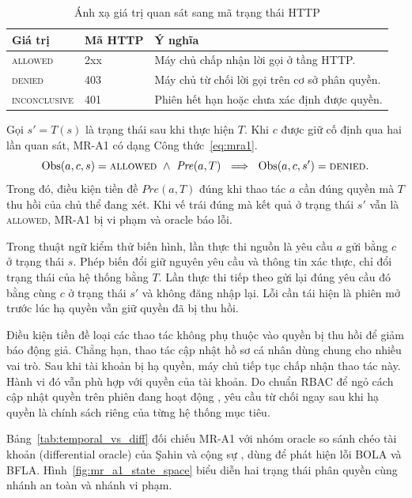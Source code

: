 \begin{table}[htbp]
  \centering
  \caption{Ánh xạ giá trị quan sát sang mã trạng thái HTTP}
  \label{tab:obs_status}
  \begin{tabularx}{\textwidth}{llX}
    \toprule
    Giá trị & Mã HTTP & Ý nghĩa \\
    \midrule
    \textsc{allowed} & 2xx & Máy chủ chấp nhận lời gọi ở tầng HTTP. \\
    \textsc{denied} & 403 & Máy chủ từ chối lời gọi trên cơ sở phân quyền. \\
    \textsc{inconclusive} & 401 & Phiên hết hạn hoặc chưa xác định được quyền. \\
    \bottomrule
  \end{tabularx}
\end{table}

Gọi $s' = T(s)$ là trạng thái sau khi thực hiện $T$. Khi $c$ được giữ cố định qua hai lần quan sát, MR-A1 có dạng Công thức~\eqref{eq:mra1}.
\begin{equation}
  \mathrm{Obs}(a, c, s) = \textsc{allowed}\ \wedge\ \mathit{Pre}(a, T)\ \implies\ \mathrm{Obs}(a, c, s') = \textsc{denied}.
  \label{eq:mra1}
\end{equation}
Trong đó, điều kiện tiền đề $\mathit{Pre}(a, T)$ đúng khi thao tác $a$ cần đúng quyền mà $T$ thu hồi của chủ thể đang xét. Khi vế trái đúng mà kết quả ở trạng thái $s'$ vẫn là \textsc{allowed}, MR-A1 bị vi phạm và oracle báo lỗi.

Trong thuật ngữ kiểm thử biến hình, lần thực thi nguồn là yêu cầu $a$ gửi bằng $c$ ở trạng thái $s$. Phép biến đổi giữ nguyên yêu cầu và thông tin xác thực, chỉ đổi trạng thái của hệ thống bằng $T$. Lần thực thi tiếp theo gửi lại đúng yêu cầu đó bằng cùng $c$ ở trạng thái $s'$ và không đăng nhập lại. Lỗi cần tái hiện là phiên mở trước lúc hạ quyền vẫn giữ quyền đã bị thu hồi.

Điều kiện tiền đề loại các thao tác không phụ thuộc vào quyền bị thu hồi để giảm báo động giả. Chẳng hạn, thao tác cập nhật hồ sơ cá nhân dùng chung cho nhiều vai trò. Sau khi tài khoản bị hạ quyền, máy chủ tiếp tục chấp nhận thao tác này. Hành vi đó vẫn phù hợp với quyền của tài khoản. Do chuẩn RBAC để ngỏ cách cập nhật quyền trên phiên đang hoạt động \cite{incits359draft}, yêu cầu từ chối ngay sau khi hạ quyền là chính sách riêng của từng hệ thống mục tiêu.

Bảng~\ref{tab:temporal_vs_diff} đối chiếu MR-A1 với nhóm oracle so sánh chéo tài khoản (differential oracle) của Şahin và cộng sự \cite{sahin2024bola}, dùng để phát hiện lỗi BOLA và BFLA. Hình~\ref{fig:mr_a1_state_space} biểu diễn hai trạng thái phân quyền cùng nhánh an toàn và nhánh vi phạm.

